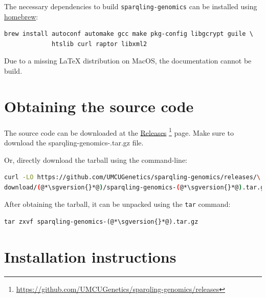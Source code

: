   The necessary dependencies to build \texttt{sparqling-genomics} can be
  installed using \href{https://brew.sh/}{homebrew}:

\begin{siderules}
\begin{verbatim}
brew install autoconf automake gcc make pkg-config libgcrypt guile \
             htslib curl raptor libxml2
\end{verbatim}
\end{siderules}

  Due to a missing \LaTeX{} distribution on MacOS, the documentation
  cannot be build.

\section{Obtaining the source code}
\label{sec:obtaining-tarball}

  \begin{sloppypar}
  The source code can be downloaded at the
  \href{https://github.com/UMCUGenetics/sparqling-genomics/releases}%
  {Releases}%
  \footnote{\url{https://github.com/UMCUGenetics/sparqling-genomics/releases}}
  page.  Make sure to download the {\fontfamily{\ttdefault}\selectfont
    sparqling-genomics-\sgversion{}.tar.gz} file.
  \end{sloppypar}

  Or, directly download the tarball using the command-line:
\begin{siderules}
\begin{lstlisting}[language=bash]
curl -LO https://github.com/UMCUGenetics/sparqling-genomics/releases/\
download/(@*\sgversion{}*@)/sparqling-genomics-(@*\sgversion{}*@).tar.gz
\end{lstlisting}
\end{siderules}

  After obtaining the tarball, it can be unpacked using the \texttt{tar}
  command:

\begin{siderules}
\begin{lstlisting}
tar zxvf sparqling-genomics-(@*\sgversion{}*@).tar.gz
\end{lstlisting}
\end{siderules}

\section{Installation instructions}

